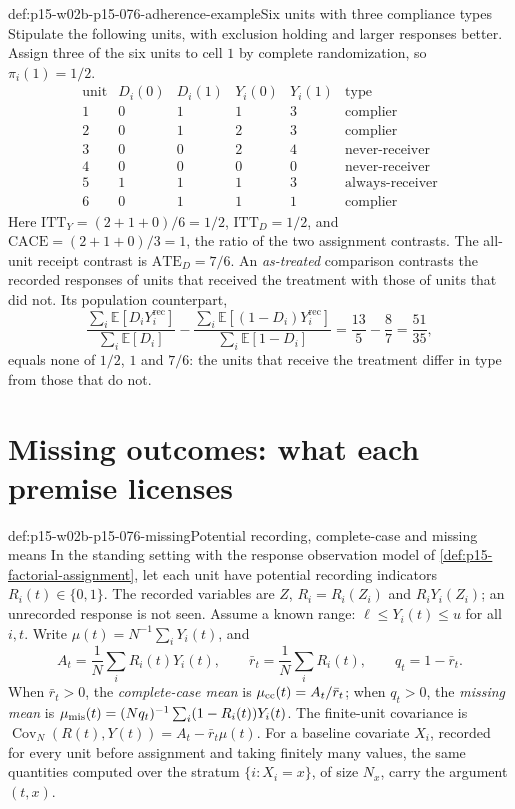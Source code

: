 \begin{hbexample}{def:p15-w02b-p15-076-adherence-example}{Six units with three compliance types}
Stipulate the following units, with exclusion holding and larger responses
better. Assign three of the six units to cell \(1\) by complete
randomization, so \(\pi_i(1)=1/2\).
\[
\begin{array}{c|cccc|c}
 \text{unit}&D_i(0)&D_i(1)&Y_i(0)&Y_i(1)&\text{type}\\\hline
 1&0&1&1&3&\text{complier}\\
 2&0&1&2&3&\text{complier}\\
 3&0&0&2&4&\text{never-receiver}\\
 4&0&0&0&0&\text{never-receiver}\\
 5&1&1&1&3&\text{always-receiver}\\
 6&0&1&1&1&\text{complier}
\end{array}
\]
Here \(\mathrm{ITT}_Y=(2+1+0)/6=1/2\), \(\mathrm{ITT}_D=1/2\), and
\(\mathrm{CACE}=(2+1+0)/3=1\), the ratio of the two assignment contrasts.
The all-unit receipt contrast is \(\mathrm{ATE}_D=7/6\). An
\emph{as-treated} comparison contrasts the recorded responses of units
that received the treatment with those of units that did not. Its
population counterpart,
\[
 \frac{\sum_i\mathbb E[D_iY_i^{\mathrm{rec}}]}{\sum_i\mathbb E[D_i]}
 -\frac{\sum_i\mathbb E[(1-D_i)Y_i^{\mathrm{rec}}]}{\sum_i\mathbb E[1-D_i]}
 =\frac{13}{5}-\frac87=\frac{51}{35},
\]
equals none of \(1/2\), \(1\) and \(7/6\): the units that receive the
treatment differ in type from those that do not.
\end{hbexample}

\section{Missing outcomes: what each premise licenses}
\label{sec:p15-w02b-p15-076-missing}

\begin{hbdefinition}{def:p15-w02b-p15-076-missing}{Potential recording, complete-case and missing means}
In the standing setting with the response observation model of
\cref{def:p15-factorial-assignment}, let each unit have potential
recording indicators \(R_i(t)\in\{0,1\}\). The recorded variables are
\(Z\), \(R_i=R_i(Z_i)\) and \(R_iY_i(Z_i)\); an unrecorded response is
not seen. Assume a known range: \(\ell\leq Y_i(t)\leq u\) for all
\(i,t\). Write \(\mu(t)=N^{-1}\sum_iY_i(t)\), and
\[
 A_t=\frac1N\sum_iR_i(t)Y_i(t),\qquad
 \bar r_t=\frac1N\sum_iR_i(t),\qquad q_t=1-\bar r_t.
\]
When \(\bar r_t>0\), the \emph{complete-case mean} is
\(\mu_{\rm cc}(t)=A_t/\bar r_t\); when \(q_t>0\), the \emph{missing
mean} is \(\mu_{\rm mis}(t)=(N q_t)^{-1}\sum_i(1-R_i(t))Y_i(t)\). The
finite-unit covariance is
\(\operatorname{Cov}_N(R(t),Y(t))=A_t-\bar r_t\mu(t)\).
For a baseline covariate \(X_i\), recorded for every unit before
assignment and taking finitely many values, the same quantities computed
over the stratum \(\{i:X_i=x\}\), of size \(N_x\), carry the argument
\((t,x)\).
\end{hbdefinition}

